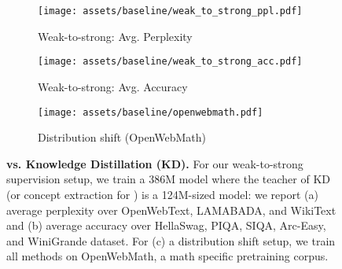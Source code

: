 \begin{figure*}[t]
\centering\small
\begin{subfigure}{0.3275\textwidth}
    \texttt{[image: assets/baseline/weak\_to\_strong\_ppl.pdf]}
    \caption{Weak-to-strong: Avg. Perplexity}
    \label{fig:weak_to_strong_perp}
\end{subfigure}
\hfill
\begin{subfigure}{0.3275\textwidth}
    \texttt{[image: assets/baseline/weak\_to\_strong\_acc.pdf]}
    \caption{Weak-to-strong: Avg. Accuracy}
    \label{fig:weak_to_strong}
\end{subfigure}
\hfill
\begin{subfigure}{0.3275\textwidth}
    \texttt{[image: assets/baseline/openwebmath.pdf]}
    \caption{Distribution shift (OpenWebMath)}
    \label{fig:dist_shift}
\end{subfigure}
\caption{
\textbf{\sname vs. Knowledge Distillation (KD).} 
For our weak-to-strong supervision setup, we train a 386M model where the teacher of KD (or concept extraction for \sname) is a 124M-sized model: we report (a) average perplexity over OpenWebText, LAMABADA, and WikiText and (b) average accuracy over HellaSwag, PIQA, SIQA, Arc-Easy, and WiniGrande dataset. For (c) a distribution shift setup, we train all methods on OpenWebMath, a math specific pretraining corpus.
}
\label{fig:baseline}
\end{figure*}
